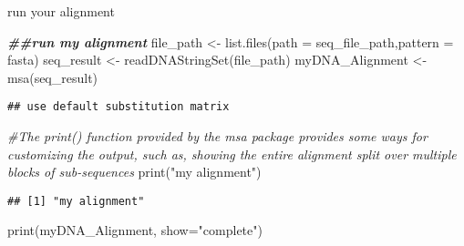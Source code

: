 \documentclass[
]{article}
\newenvironment{Shaded}{\begin{snugshade}}{\end{snugshade}}
\newcommand{\AttributeTok}[1]{\textcolor[rgb]{0.77,0.63,0.00}{#1}}
\newcommand{\CommentTok}[1]{\textcolor[rgb]{0.56,0.35,0.01}{\textit{#1}}}
\newcommand{\DocumentationTok}[1]{\textcolor[rgb]{0.56,0.35,0.01}{\textbf{\textit{#1}}}}
\newcommand{\FunctionTok}[1]{\textcolor[rgb]{0.00,0.00,0.00}{#1}}
\newcommand{\NormalTok}[1]{#1}
\newcommand{\OtherTok}[1]{\textcolor[rgb]{0.56,0.35,0.01}{#1}}
\newcommand{\StringTok}[1]{\textcolor[rgb]{0.31,0.60,0.02}{#1}}
\begin{document}
run your alignment

\begin{Shaded}
\begin{Highlighting}[]
\DocumentationTok{\#\#run my alignment}
\NormalTok{file\_path }\OtherTok{\textless{}{-}} \FunctionTok{list.files}\NormalTok{(}\AttributeTok{path =}\NormalTok{ seq\_file\_path,}\AttributeTok{pattern =} \StringTok{\textquotesingle{}fasta\textquotesingle{}}\NormalTok{)}
\NormalTok{seq\_result }\OtherTok{\textless{}{-}} \FunctionTok{readDNAStringSet}\NormalTok{(file\_path)}
\NormalTok{myDNA\_Alignment }\OtherTok{\textless{}{-}} \FunctionTok{msa}\NormalTok{(seq\_result)}
\end{Highlighting}
\end{Shaded}

\begin{verbatim}
## use default substitution matrix
\end{verbatim}

\begin{Shaded}
\begin{Highlighting}[]
\CommentTok{\#The print() function provided by the msa package provides some ways for customizing the output, such as, showing the entire alignment split over multiple blocks of sub{-}sequences}
\FunctionTok{print}\NormalTok{(}\StringTok{"my alignment"}\NormalTok{)}
\end{Highlighting}
\end{Shaded}

\begin{verbatim}
## [1] "my alignment"
\end{verbatim}

\begin{Shaded}
\begin{Highlighting}[]
\FunctionTok{print}\NormalTok{(myDNA\_Alignment, }\AttributeTok{show=}\StringTok{"complete"}\NormalTok{)}
\end{Highlighting}
\end{Shaded}
\end{document}
